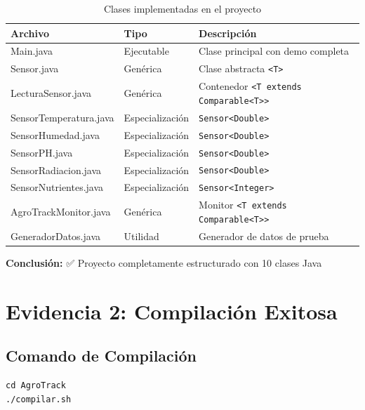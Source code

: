 \documentclass[12pt,a4paper]{article}
\begin{document}
\begin{table}[h]
\centering
\begin{tabular}{|l|l|p{6cm}|}
\hline
\rowcolor{agrogreen!20}
\textbf{Archivo} & \textbf{Tipo} & \textbf{Descripción} \\
\hline
Main.java & Ejecutable & Clase principal con demo completa \\
\hline
Sensor.java & Genérica & Clase abstracta \texttt{<T>} \\
\hline
LecturaSensor.java & Genérica & Contenedor \texttt{<T extends Comparable<T>>} \\
\hline
SensorTemperatura.java & Especialización & \texttt{Sensor<Double>} \\
\hline
SensorHumedad.java & Especialización & \texttt{Sensor<Double>} \\
\hline
SensorPH.java & Especialización & \texttt{Sensor<Double>} \\
\hline
SensorRadiacion.java & Especialización & \texttt{Sensor<Double>} \\
\hline
SensorNutrientes.java & Especialización & \texttt{Sensor<Integer>} \\
\hline
AgroTrackMonitor.java & Genérica & Monitor \texttt{<T extends Comparable<T>>} \\
\hline
GeneradorDatos.java & Utilidad & Generador de datos de prueba \\
\hline
\end{tabular}
\caption{Clases implementadas en el proyecto}
\label{tab:clases}
\end{table}

\textbf{Conclusión:} ✅ Proyecto completamente estructurado con 10 clases Java


\section{Evidencia 2: Compilación Exitosa}

\subsection{Comando de Compilación}

\begin{tcolorbox}[colback=gray!5,colframe=gray!75!black,title=\textbf{Comando Ejecutado}]
\begin{lstlisting}[style=bashstyle]
cd AgroTrack
./compilar.sh
\end{lstlisting}
\end{tcolorbox}
\end{document}
